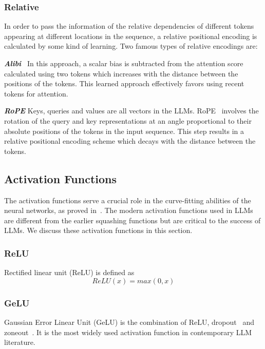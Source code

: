 \subsubsection{Relative}
In order to pass the information of the relative dependencies of different tokens appearing at different locations in the sequence, a relative positional encoding is calculated by some kind of learning. Two famous types of relative encodings are: 

\noindent
\emph{\textbf{Alibi}~\cite{alibi}} In this approach, a scalar bias is subtracted from the attention score calculated using two tokens which increases with the distance between the positions of the tokens. This learned approach effectively favors using recent tokens for attention. 

\noindent
\emph{\textbf{RoPE}} Keys, queries and values are all vectors in the LLMs. RoPE~\cite{su2021roformer} involves the rotation of the query and key representations at an angle proportional to their absolute positions of the tokens in the input sequence. This step results in a relative positional encoding scheme which decays with the distance between the tokens.

\subsection{Activation Functions}
\label{sec:activation functions}
The activation functions serve a crucial role in the curve-fitting abilities of the neural networks, as proved in~\cite{activationfunction}. The modern activation functions used in LLMs are different from the earlier squashing functions but are critical to the success of LLMs. We discuss these activation functions in this section.  

\subsubsection{ReLU~\cite{relu}}
\label{ss:relu}
Rectified linear unit (ReLU) is defined as
\begin{equation}
ReLU(x) = max(0,x)    
\label{eq:relu}
\end{equation}

\subsubsection{GeLU~\cite{gelu}}
\label{ss:gelu}
Gaussian Error Linear Unit (GeLU) is the combination of ReLU,  dropout~\cite{srivastava2014dropout} and zoneout~\cite{krueger2016zoneout}. It is the most widely used activation function in contemporary LLM literature.

